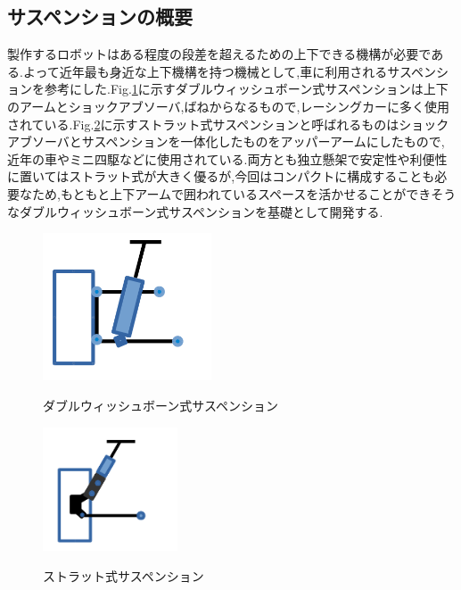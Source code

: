 \documentclass[a4paper]{jarticle}
\begin{document}
\subsection{サスペンションの概要}
製作するロボットはある程度の段差を超えるための上下できる機構が必要である.よって近年最も身近な上下機構を持つ機械として,車に利用されるサスペンションを参考にした.Fig.\ref{fig:doublewish}に示すダブルウィッシュボーン式サスペンションは上下のアームとショックアブソーバ,ばねからなるもので,レーシングカーに多く使用されている.Fig.\ref{fig:strat}に示すストラット式サスペンションと呼ばれるものはショックアブソーバとサスペンションを一体化したものをアッパーアームにしたもので,近年の車やミニ四駆などに使用されている.両方とも独立懸架で安定性や利便性に置いてはストラット式が大きく優るが,今回はコンパクトに構成することも必要なため,もともと上下アームで囲われているスペースを活かせることができそうなダブルウィッシュボーン式サスペンションを基礎として開発する.

\begin{figure}[htp]
 \begin{center}
  \includegraphics[width=50mm]{img/fig1.png}
 　\caption{ダブルウィッシュボーン式サスペンション}
  \label{fig:doublewish}%
 \end{center}
\end{figure}

\begin{figure}[htp]
 \begin{center}
  \includegraphics[width=40mm]{img/fig2.png}
 　\caption{ストラット式サスペンション}
  \label{fig:strat}%
 \end{center}
\end{figure}
\end{document}
